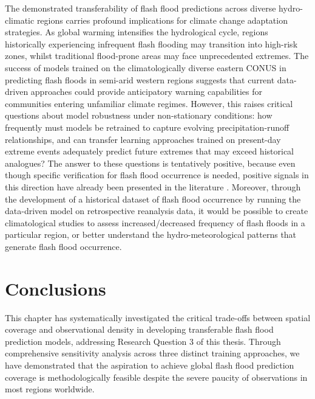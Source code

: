 The  demonstrated transferability of flash flood predictions across diverse hydro-climatic regions carries profound implications for climate change adaptation strategies. As global warming intensifies the hydrological cycle, regions historically experiencing infrequent flash flooding may transition into high-risk zones, whilst traditional flood-prone areas may face unprecedented extremes. The success of models trained on the climatologically diverse eastern CONUS in predicting flash floods in semi-arid western regions suggests that current data-driven approaches could provide anticipatory warning capabilities for communities entering unfamiliar climate regimes. However, this raises critical questions about model robustness under non-stationary conditions: how frequently must models be retrained to capture evolving precipitation-runoff relationships, and can transfer learning approaches trained on present-day extreme events adequately predict future extremes that may exceed historical analogues? The answer to these questions is tentatively positive, because even though specific verification for flash flood occurrence is needed, positive signals in this direction have already been presented in the literature \citep{Bertola_2023}. Moreover, through the development of a historical dataset of flash flood occurrence by running the data-driven model on retrospective reanalysis data, it would be possible to create climatological studies to assess increased/decreased frequency of flash floods in a particular region, or better understand the hydro-meteorological patterns that generate flash flood occurrence. 


\section{Conclusions}
\label{regional_to_global_training_conclusions}

This chapter has systematically investigated the critical trade-offs between spatial coverage and observational density in developing transferable flash flood prediction models, addressing Research Question 3 of this thesis. Through comprehensive sensitivity analysis across three distinct training approaches, we have demonstrated that the aspiration to achieve global flash flood prediction coverage is methodologically feasible despite the severe paucity of observations in most regions worldwide.

